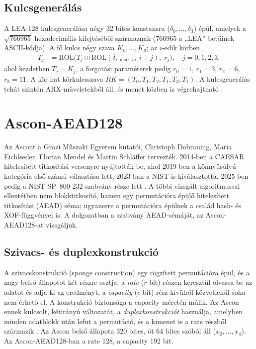 \documentclass[a4paper,12pt]{report}
\theoremstyle{definition}
\theoremstyle{remark}
\begin{document}
\subsection{Kulcsgenerálás}\label{sec:lea_kulcs}

A LEA-128 kulcsgenerálása négy 32 bites konstansra ($\delta_0, \ldots, \delta_3$) épül, amelyek a $\sqrt{766965}$ hexadecimális kifejtéséből származnak (766965 a „LEA'' betűinek ASCII-kódja). A fő kulcs négy szava $K_0, \ldots, K_3$; az $i$-edik körben
\begin{align}
T_j &= \text{ROL}\big(T_j \mathbin{\boxplus} \text{ROL}(\delta_{i \bmod 4},\; i+j),\; r_j\big), \quad j = 0,1,2,3,
\end{align}
ahol kezdetben $T_j = K_j$, a forgatási paraméterek pedig $r_0 = 1$, $r_1 = 3$, $r_2 = 6$, $r_3 = 11$. A kör hat körkulcsszava $RK = (T_0, T_1, T_2, T_1, T_3, T_1)$. A kulcsgenerálás tehát szintén ARX-műveletekből áll, és menet közben is végrehajtható \cite{Hong2013}.

\section{Ascon-AEAD128}\label{sec:ascon}

Az Ascont a Grazi Műszaki Egyetem kutatói, Christoph Dobraunig, Maria Eichlseder, Florian Mendel és Martin Schläffer tervezték. 2014-ben a CAESAR hitelesített titkosítási versenyre nyújtották be, ahol 2019-ben a könnyűsúlyú kategória első számú választása lett, 2023-ban a NIST is kiválasztotta, 2025-ben pedig a NIST SP~800-232 szabvány része lett \cite{Dobraunig2021,NISTLWC2023,NISTSP800232}. A többi vizsgált algoritmussal ellentétben nem blokktitkosító, hanem egy permutációra épülő hitelesített titkosítási (AEAD) séma; ugyanerre a permutációra épülnek a család hash- és XOF-függvényei is. A dolgozatban a szabvány AEAD-sémáját, az Ascon-AEAD128-at vizsgáljuk.

\subsection{Szivacs- és duplexkonstrukció}\label{sec:ascon_szivacs}

A szivacskonstrukció (sponge construction) egy rögzített permutációra épül, és a nagy belső állapotot két részre osztja: a \emph{rate} ($r$ bit) részen keresztül olvassa be az adatot és adja ki az eredményt, a \emph{capacity} ($c$ bit) rész kívülről közvetlenül soha nem érhető el. A konstrukció biztonsága a capacity méretén múlik. Az Ascon ennek kulcsolt, kétirányú változatát, a \emph{duplexkonstrukciót} használja, amelyben minden adatblokk után lefut a permutáció, és a kimenet is a rate részből származik \cite{Dobraunig2021}. Az Ascon belső állapota 320 bites, öt 64 bites szóból áll ($x_0, \ldots, x_4$). Az Ascon-AEAD128-ban a rate 128, a capacity 192 bit.
\end{document}
